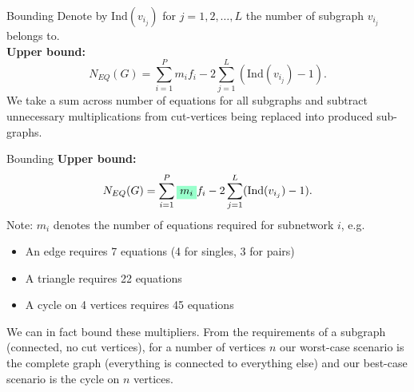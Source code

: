 \documentclass[unknownkeysallowed]{beamer}
\newcommand{\highlight}[1]{%
  \colorbox{highlight-colour}{$\displaystyle#1$}}
\begin{document}

\begin{frame}{Bounding}
Denote by $\text{Ind}(v_{i_j})$ for $j=1,2,\dots,L$ the number of subgraph $v_{i_j}$ belongs to.\\
\textbf{Upper bound:}
\begin{equation*}
N_{EQ}(G) = \sum^P_{i=1}m_if_i-2\sum^L_{j=1}(\text{Ind}(v_{i_j})-1).
\end{equation*}
We take a sum across number of equations for all subgraphs and subtract unnecessary multiplications from cut-vertices being replaced into produced sub-graphs. \cite{kiss_2014}

\end{frame}


\begin{frame}{Bounding}
\textbf{Upper bound:}
\begin{equation*}
N_{EQ}(G) = \sum^P_{i=1}\highlight{m_i}f_i-2\sum^L_{j=1}(\text{Ind}(v_{i_j})-1).
\end{equation*}
Note: $m_i$ denotes the number of equations required for subnetwork $i$, e.g.
\begin{itemize}
	\item An edge requires 7 equations (4 for singles, 3 for pairs)
	\item A triangle requires 22 equations
	\item A cycle on 4 vertices requires 45 equations
\end{itemize}
\end{frame}


\begin{frame}
We can in fact bound these multipliers. From the requirements of a subgraph (connected, no cut vertices), for a number of vertices $n$ our worst-case scenario is the complete graph (everything is connected to everything else) and our best-case scenario is the cycle on $n$ vertices.


\end{frame}
\end{document}
